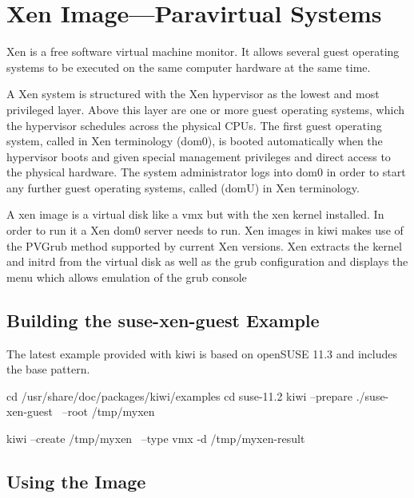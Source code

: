 \chapter{Xen Image---Paravirtual Systems}
\label{chapter:xen}
\minitoc

Xen is a free software virtual machine monitor. It allows several
guest operating systems to be executed on the same computer hardware
at the same time.

A Xen system is structured with the Xen hypervisor as the lowest and
most privileged layer.%
Above this layer are one or more guest
operating systems, which the hypervisor schedules across the physical
CPUs. The first guest operating system, called in Xen terminology
 (dom0), is booted automatically when the hypervisor boots
and given special management privileges and direct access to the physical
hardware. The system administrator logs into dom0 in order to start
any further guest operating systems, called  (domU) in
Xen terminology.

A xen image is a virtual disk like a vmx but with the xen kernel
installed. In order to run it a Xen dom0 server needs to run. Xen
images in kiwi makes use of the PVGrub method supported by current
Xen versions. Xen extracts the kernel and initrd from the virtual
disk as well as the grub configuration and displays the menu which
allows emulation of the grub console

\section{Building the suse-xen-guest Example}

The latest example provided with kiwi is based on openSUSE 11.3 and includes
the base pattern. 

\begin{Command}{12cm}
cd /usr/share/doc/packages/kiwi/examples
cd suse-11.2
kiwi --prepare ./suse-xen-guest \
     --root /tmp/myxen
\end{Command}

\begin{Command}{12cm}
kiwi --create /tmp/myxen \
     --type vmx -d /tmp/myxen-result
\end{Command}

\section{Using the Image}

